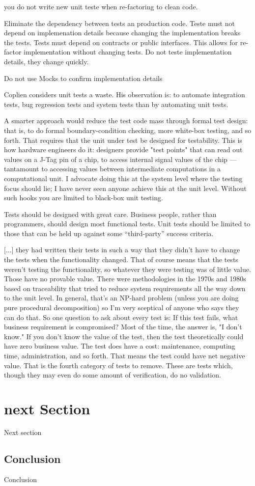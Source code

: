 \documentclass{article}
\begin{document}
you do not write new unit teste when re-factoring to clean code.

Eliminate the dependency between tests an production code.
Teste must not depend on implemenation details because changing the implementation breaks the tests.
Tests must depend on contracts or public interfaces.
This allows for re-factor implementation without changing tests.
Do not teste implementation details, they change quickly.

Do not use Mocks to confirm implementation details


Coplien \cite{WEBSITE:UnitTestIsWaste} considers unit tests a waste. His observation is: to automate integration tests, bug regression tests and system tests than by automating unit tests. 

A smarter approach would reduce the test code mass through formal test design: that is, to do formal boundary-condition checking, more white-box testing, and so forth. That requires that the unit under test be designed for testability. This is how hardware engineers do it: designers provide "test points" that can read out values on a J-Tag pin of a chip, to access internal signal values of the chip — tantamount to accessing values between intermediate computations in a computational unit. I advocate doing this at the system level where the testing focus should lie; I have never seen anyone achieve this at the unit level. Without such hooks you are limited to black-box unit testing. 

Tests should be designed with great care. Business people, rather than programmers, should design most functional tests. Unit tests should be limited to those that can be held up against some “third-party” success criteria.

[...] they had written their tests in such a way that they didn't have to change the tests when the functionality changed. That of course means that the tests  weren't testing the functionality, so whatever they were testing was of little value. Those have no provable value. There were methodologies in the 1970s and 1980s based on traceability that tried to reduce system requirements all the way down to the unit level. In general, that's an NP-hard problem (unless you are doing pure procedural decomposition) so I'm very sceptical of anyone who says they can do that. So one question to ask about every test is: If this test fails, what business requirement is compromised? Most of the time, the answer is, "I don't know." If you don't know the value of the test, then the test theoretically could have zero business value. The test does have a cost: maintenance, computing time, administration, and so forth. That means the test could have net negative value. That is the fourth category of tests to remove. These are tests which, though they may even do some amount of verification, do no validation.

\section{next Section }

Next section



\subsection{Conclusion}

Conclusion

\newpage

 

\end{document}
